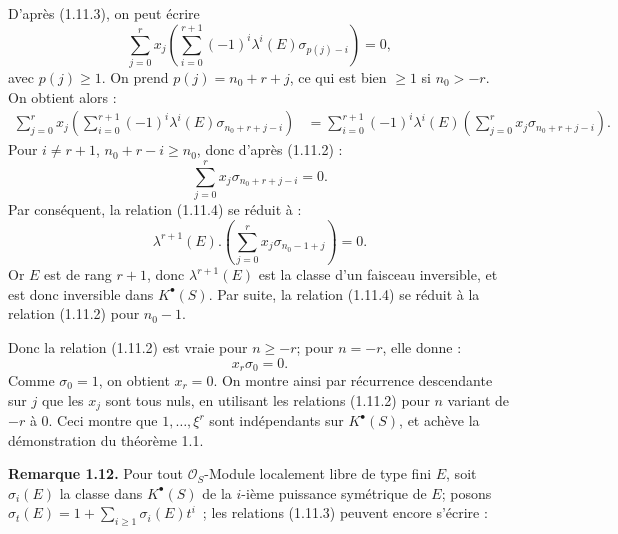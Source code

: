 D'après (1.11.3), on
peut écrire
\begin{equation}\tag{1.11.4}
  \sum_{j=0}^r x_j\left(\sum_{i=0}^{r+1}(-1)^i\lambda^i(E)\sigma_{p(j)-i}\right)=0,
\end{equation}
avec \(p(j)\geq1\). On prend \(p(j)=n_0+r+j\), ce qui est bien \(\geq1\) si \(n_0>-r\). On obtient alors :
\[
\begin{aligned}
\sum_{j=0}^r x_j\left(\sum_{i=0}^{r+1}(-1)^i\lambda^i(E)\sigma_{n_0+r+j-i}\right)
&=\sum_{i=0}^{r+1}(-1)^i\lambda^i(E)
   \left(\sum_{j=0}^r x_j\sigma_{n_0+r+j-i}\right).
\end{aligned}
\]
Pour \(i\neq r+1\), \(n_0+r-i\geq n_0\), donc d'après (1.11.2) :
\[
  \sum_{j=0}^r x_j\sigma_{n_0+r+j-i}=0.
\]
Par conséquent, la relation (1.11.4) se réduit à :
\[
  \lambda^{r+1}(E).\left(\sum_{j=0}^r x_j\sigma_{n_0-1+j}\right)=0.
\]
Or \(E\) est de rang \(r+1\), donc \(\lambda^{r+1}(E)\) est la classe d'un faisceau inversible, et est donc inversible dans \(K^{\bullet}(S)\). Par suite, la relation (1.11.4) se réduit à la relation (1.11.2) pour \(n_0-1\).

Donc la relation (1.11.2) est vraie pour \(n\geq-r\); pour \(n=-r\), elle donne :
\[
  x_r\sigma_0=0.
\]
Comme \(\sigma_0=1\), on obtient \(x_r=0\). On montre ainsi par récurrence descendante sur \(j\) que les \(x_j\) sont tous nuls, en utilisant les relations (1.11.2) pour \(n\) variant de \(-r\) à \(0\). Ceci montre que \(1,\ldots,\xi^r\) sont indépendants sur \(K^{\bullet}(S)\), et achève la démonstration du théorème 1.1.

\textbf{Remarque 1.12.} Pour tout \(\mathcal O_S\)-Module localement libre de type fini \(E\), soit \(\sigma_i(E)\) la classe dans \(K^{\bullet}(S)\) de la \(i\)-ième puissance symétrique de \(E\); posons \(\sigma_t(E)=1+\sum_{i\geq1}\sigma_i(E)t^i\)~; les relations (1.11.3) peuvent encore s'écrire :
